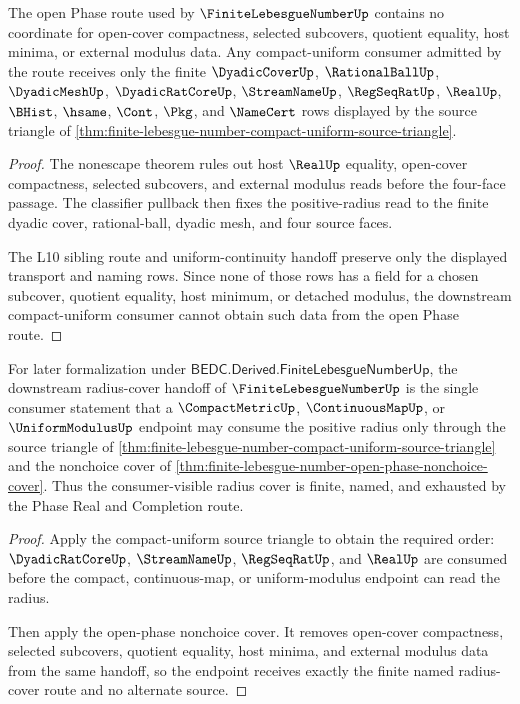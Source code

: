 \begin{theorem}
\label{thm:finite-lebesgue-number-open-phase-nonchoice-cover}
The open Phase route used by $\FiniteLebesgueNumberUp$ contains no coordinate for open-cover compactness, selected subcovers, quotient equality, host minima, or external modulus data. Any compact-uniform consumer admitted by the route receives only the finite $\DyadicCoverUp$, $\RationalBallUp$, $\DyadicMeshUp$, $\DyadicRatCoreUp$, $\StreamNameUp$, $\RegSeqRatUp$, $\RealUp$, $\BHist$, $\hsame$, $\Cont$, $\Pkg$, and $\NameCert$ rows displayed by the source triangle of \autoref{thm:finite-lebesgue-number-compact-uniform-source-triangle}.
\end{theorem}

\begin{proof}
The nonescape theorem rules out host $\RealUp$ equality, open-cover compactness, selected subcovers, and external modulus reads before the four-face passage. The classifier pullback then fixes the positive-radius read to the finite dyadic cover, rational-ball, dyadic mesh, and four source faces.

The L10 sibling route and uniform-continuity handoff preserve only the displayed transport and naming rows. Since none of those rows has a field for a chosen subcover, quotient equality, host minimum, or detached modulus, the downstream compact-uniform consumer cannot obtain such data from the open Phase route.
\end{proof}

\begin{theorem}
\label{thm:finite-lebesgue-number-uniform-consumer-radius-cover}
For later formalization under $\mathsf{BEDC.Derived.FiniteLebesgueNumberUp}$, the downstream radius-cover handoff of $\FiniteLebesgueNumberUp$ is the single consumer statement that a $\CompactMetricUp$, $\ContinuousMapUp$, or $\UniformModulusUp$ endpoint may consume the positive radius only through the source triangle of \autoref{thm:finite-lebesgue-number-compact-uniform-source-triangle} and the nonchoice cover of \autoref{thm:finite-lebesgue-number-open-phase-nonchoice-cover}. Thus the consumer-visible radius cover is finite, named, and exhausted by the Phase Real and Completion route.
\end{theorem}

\begin{proof}
Apply the compact-uniform source triangle to obtain the required order: $\DyadicRatCoreUp$, $\StreamNameUp$, $\RegSeqRatUp$, and $\RealUp$ are consumed before the compact, continuous-map, or uniform-modulus endpoint can read the radius.

Then apply the open-phase nonchoice cover. It removes open-cover compactness, selected subcovers, quotient equality, host minima, and external modulus data from the same handoff, so the endpoint receives exactly the finite named radius-cover route and no alternate source.
\end{proof}

